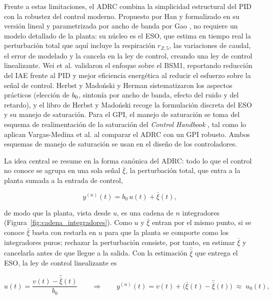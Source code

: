 Frente a estas limitaciones, el ADRC combina la simplicidad estructural del
PID con la robustez del control moderno. Propuesto por Han \cite{han2009adrc} y
formalizado en su versión lineal y parametrizada por ancho de banda por Gao
\cite{gao2003scaling,gao2014centrality}, no requiere un modelo detallado de la
planta: su núcleo es el ESO, que estima en tiempo real la perturbación total
que aquí incluye la respiración $r_{Z,5}$, las variaciones de caudal, el
error de modelado y la cancela en la ley de control, creando una ley de control linealizante. Wei et al.
\cite{wei2020disturbance,Wei2020b} validaron el enfoque sobre el BSM1,
reportando reducción del IAE frente al PID y mejor eficiencia energética al reducir el esfuerzo sobre la señal de control. Herbst \cite{herbst2013practical} y Madoński y Herman
\cite{madonski2015survey} sistematizaron los aspectos prácticos (elección de
$b_{0}$, sintonía por ancho de banda, efecto del ruido y del retardo), y el
libro de Herbst y Madoński \cite{herbst2024adrc} recoge la formulación discreta
del ESO y su manejo de saturación. Para el GPI, el manejo de saturación se
toma del esquema de realimentación de la saturación del \emph{Control
Handbook} \cite{levine2011handbook}, tal como lo aplican Vargas-Medina et al.
\cite{vargas2026microgrids} al comparar el ADRC con un GPI robusto. Ambos
esquemas de manejo de saturación se usan en el diseño de los controladores.

La idea central se resume en la forma canónica del ADRC: todo lo que el
control no conoce se agrupa en una sola señal $\bar{\xi}$, la perturbación total, que
entra a la planta sumada a la entrada de control,

\begin{equation}
    y^{(n)}(t) = b_0\, u(t) + \bar{\xi}(t) ,
    \label{eq:intro_canonica}
\end{equation}

de modo que la planta, vista desde $u$, es una cadena de $n$ integradores
(Figura~\ref{fig:cadena_integradores}). Como $u$ y $\bar{\xi}$ entran por el mismo
punto, si se conoce $\bar{\xi}$
basta con restarla en $u$ para que la planta se comporte como los integradores
puros; rechazar la perturbación consiste, por
tanto, en estimar $\bar{\xi}$ y cancelarla antes de que llegue a la salida. Con la
estimación $\hat{\bar{\xi}}$ que entrega el ESO, la ley de control linealizante es

\begin{equation}
    u(t) = \frac{v(t) - \hat{\bar{\xi}}(t)}{b_0}
    \qquad\Longrightarrow\qquad
    y^{(n)}(t) = v(t) + \big(\bar{\xi}(t) - \hat{\bar{\xi}}(t)\big) \;\approx\; u_0(t) ,
    \label{eq:intro_linealizante}
\end{equation}

